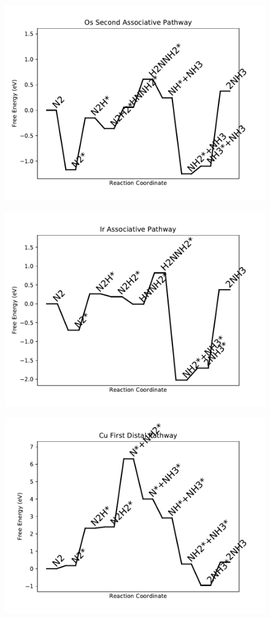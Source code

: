 \begin{figure}
\centering
\includegraphics[width=0.8\linewidth]{data/plots/Os_associative_2.pdf}
\end{figure}

\begin{figure}
\centering
\includegraphics[width=0.8\linewidth]{data/plots/Ir_associative.pdf}
\end{figure}

\begin{figure}
\centering
\includegraphics[width=0.8\linewidth]{data/plots/Cu_distal_1.pdf}
\end{figure}

